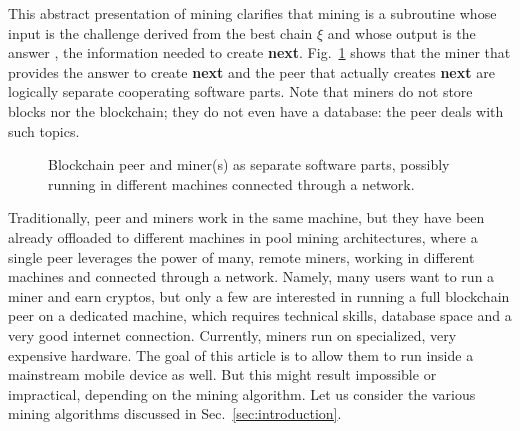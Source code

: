 This abstract presentation of mining clarifies
that mining is a subroutine whose input is the challenge derived from the best
chain $\xi$ and whose output is the answer \ie{}, the information
needed to create \textbf{next}.
Fig.~\ref{fig:mining} shows that
the miner that provides the answer to create \textbf{next}
and the peer that actually creates \textbf{next}
are logically separate cooperating software parts. Note that miners do not store
blocks nor the blockchain; they do not even have a database: the peer deals with such topics.

\begin{figure}[t]
  \begin{center}
  \end{center}
  \caption{Blockchain peer and miner(s) as separate software parts, possibly
    running in different machines connected through a network.}\label{fig:mining}
\end{figure}

Traditionally, peer and miners work in the same machine,
but they have been already offloaded to different machines in pool
mining architectures, where a single peer leverages the power of many, remote
miners, working in different machines and connected through a network.
Namely, many users want to run a miner and earn cryptos,
but only a few are interested in running a full blockchain peer on a dedicated machine,
which requires technical skills, database space and a very good internet connection.
Currently, miners run on specialized, very expensive hardware. The goal of this article
is to allow them to run inside a mainstream mobile device as well.
But this might result impossible or impractical,
depending on the mining algorithm. Let us consider the various
mining algorithms discussed in Sec.~\ref{sec:introduction}.

